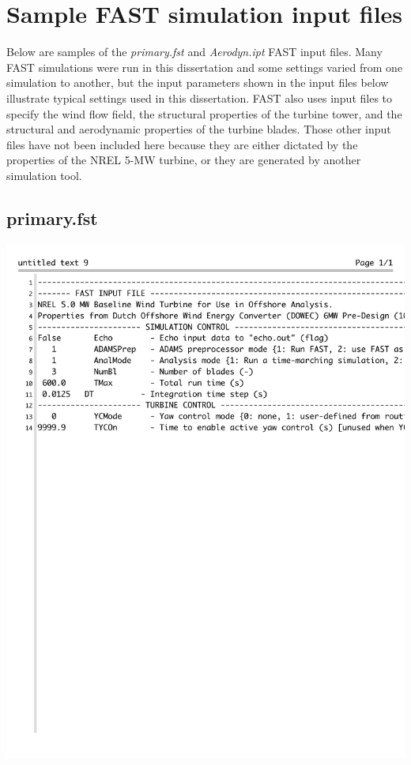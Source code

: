
\chapter{Sample FAST simulation input files} %

\label{AppendixA} %

Below are samples of the \textit{primary.fst} and \textit{Aerodyn.ipt} FAST input files. Many FAST simulations were run in this dissertation and some settings varied from one simulation to another, but the input parameters shown in the input files below illustrate typical settings used in this dissertation. FAST also uses input files to specify the wind flow field, the structural properties of the turbine tower,  and the structural and aerodynamic properties of the turbine blades. Those other input files have not been included here because they are either dictated by the properties of the NREL 5-MW turbine, or they are generated by another simulation tool.

\section{primary.fst} \label{sectionA-1}

\includegraphics[width=.95\linewidth]{Figures/AppendixAFigures/primaryP1.pdf}		

